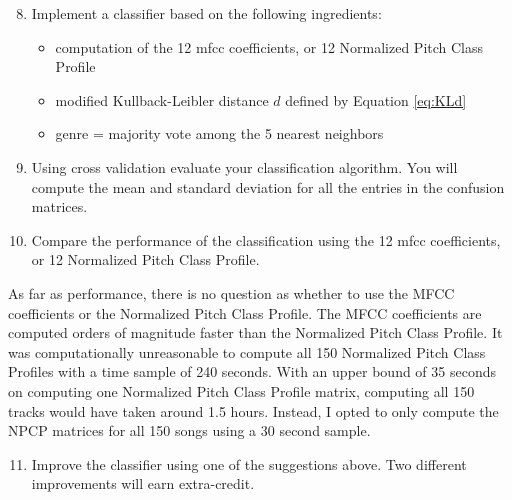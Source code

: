 \documentclass{article} %
\begin{document}
\begin{framed}
\begin{enumerate}
\setcounter{enumi}{7}
\item Implement a classifier based on the following ingredients:
\begin{itemize}
\item computation of the 12 mfcc coefficients, or 12 Normalized Pitch Class Profile
\item modified Kullback-Leibler distance $d$ defined by Equation \ref{eq:KLd}
\item genre = majority vote among the 5 nearest neighbors
\end{itemize}
\item Using cross validation evaluate your classification algorithm. You will compute the mean and standard deviation for all the entries in the confusion matrices. 
\item Compare the performance of the classification using the 12 mfcc coefficients, or 12 Normalized Pitch Class Profile. 
\end{enumerate}
\end{framed}

As far as performance, there is no question as whether to use the MFCC coefficients or the Normalized Pitch Class Profile. The MFCC coefficients are computed orders of magnitude faster
than the Normalized Pitch Class Profile. It was computationally unreasonable to compute all 150 Normalized Pitch Class Profiles with a time sample of 240 seconds. With an upper bound of 
35 seconds on computing one Normalized Pitch Class Profile matrix, computing all 150 tracks would have taken around 1.5 hours. Instead, I opted to only compute the NPCP matrices
for all 150 songs using a 30 second sample. 


\begin{framed}
\begin{enumerate}
\setcounter{enumi}{10}
\item Improve the classifier using one of the suggestions above. Two different improvements will earn extra-credit.
\end{enumerate}
\end{framed}
\end{document}
